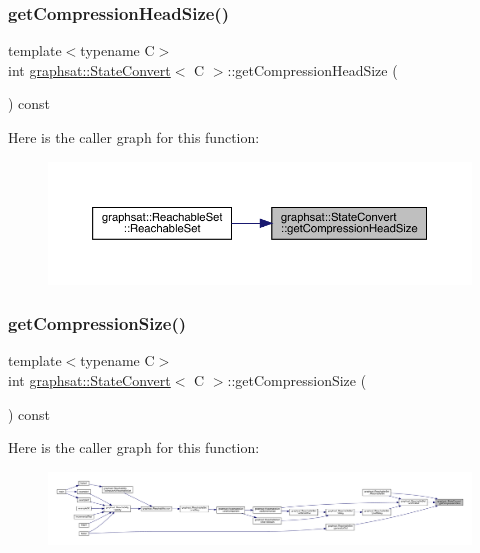 \subsubsection{\texorpdfstring{getCompressionHeadSize()}{getCompressionHeadSize()}}
{\footnotesize\ttfamily template$<$typename C$>$ \\
int \mbox{\hyperlink{classgraphsat_1_1_state_convert}{graphsat\+::\+State\+Convert}}$<$ C $>$\+::get\+Compression\+Head\+Size (\begin{DoxyParamCaption}{ }\end{DoxyParamCaption}) const\hspace{0.3cm}{\ttfamily [inline]}}

Here is the caller graph for this function\+:
\nopagebreak
\begin{figure}[H]
\begin{center}
\leavevmode
\includegraphics[width=350pt]{classgraphsat_1_1_state_convert_a94c8e2ac6473c876b3b4bab2725aab04_icgraph}
\end{center}
\end{figure}
\mbox{\label{classgraphsat_1_1_state_convert_a6bc26e52e5cc55f29f9d541fe58cd8f9}} 
\subsubsection{\texorpdfstring{getCompressionSize()}{getCompressionSize()}}
{\footnotesize\ttfamily template$<$typename C$>$ \\
int \mbox{\hyperlink{classgraphsat_1_1_state_convert}{graphsat\+::\+State\+Convert}}$<$ C $>$\+::get\+Compression\+Size (\begin{DoxyParamCaption}{ }\end{DoxyParamCaption}) const\hspace{0.3cm}{\ttfamily [inline]}}

Here is the caller graph for this function\+:
\nopagebreak
\begin{figure}[H]
\begin{center}
\leavevmode
\includegraphics[width=350pt]{classgraphsat_1_1_state_convert_a6bc26e52e5cc55f29f9d541fe58cd8f9_icgraph}
\end{center}
\end{figure}


